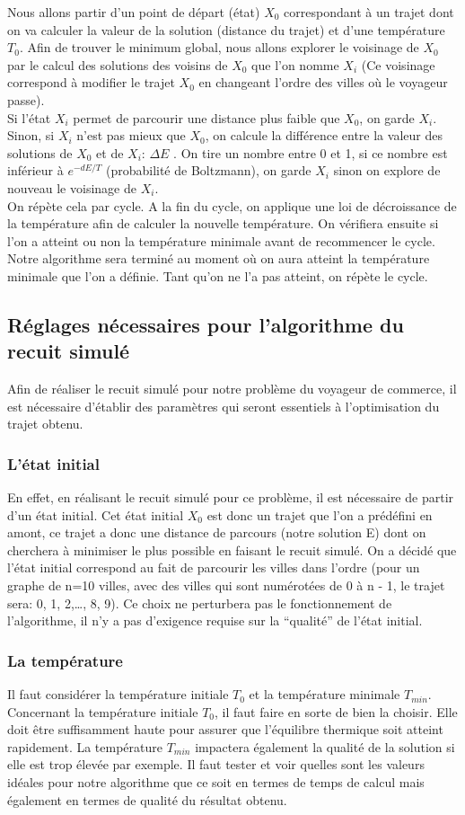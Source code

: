 \documentclass{article}
\begin{document}
Nous allons partir d’un point de départ (état) \(X_0\) correspondant à un trajet dont on va calculer la valeur de la solution (distance du trajet) et d’une température \(T_0\). Afin de trouver le minimum global, nous allons explorer le voisinage de \(X_0\) par le calcul des solutions des voisins de \(X_0\) que l’on nomme \(X_i\) (Ce voisinage correspond à modifier le trajet \(X_0\) en changeant l’ordre des villes où le voyageur passe).\\
Si l’état \(X_i\) permet de parcourir une distance plus faible que \(X_0\), on garde \(X_i\). Sinon, si \(X_i\) n’est pas mieux que \(X_0\), on calcule la différence entre la valeur des solutions de \(X_0\) et de \(X_i\): \(\Delta{E}\) . On tire un nombre entre 0 et 1, si ce nombre est inférieur à \(e^{-dE/T}\)  (probabilité de Boltzmann), on garde \(X_i\) sinon on explore de nouveau le voisinage de \(X_i\).\\
On répète cela par cycle. A la fin du cycle, on applique une loi de décroissance de la température afin de calculer la nouvelle température. On vérifiera ensuite si l’on a atteint ou non la température minimale avant de recommencer le cycle. Notre algorithme sera terminé au moment où on aura atteint la température minimale que l’on a définie. Tant qu’on ne l’a pas atteint, on répète le cycle. 
\subsection{Réglages nécessaires pour l'algorithme du recuit simulé}
Afin de réaliser le recuit simulé pour notre problème du voyageur de commerce, il est nécessaire d’établir des paramètres qui seront essentiels à l’optimisation du trajet obtenu. 
\subsubsection{L'état initial}
En effet, en réalisant le recuit simulé pour ce problème, il est nécessaire de partir d’un état initial. Cet état initial \(X_0\) est donc un trajet que l’on a prédéfini en amont, ce trajet a donc une distance de parcours (notre solution E) dont on cherchera à minimiser le plus possible en faisant le recuit simulé. On a décidé que l’état initial correspond au fait de parcourir les villes dans l’ordre (pour un graphe de n=10 villes, avec des villes qui sont numérotées de 0 à n - 1, le trajet sera: 0, 1, 2,…, 8, 9). Ce choix ne perturbera pas le fonctionnement de l’algorithme, il n’y a pas d’exigence requise sur la “qualité” de l’état initial. 
\subsubsection{La température}
Il faut considérer la température initiale \(T_0\) et la température minimale \(T_{min}\). Concernant la température initiale \(T_0\), il faut faire en sorte de bien la choisir. Elle doit être suffisamment haute pour assurer que l’équilibre thermique soit atteint rapidement. La température \(T_{min}\) impactera également la qualité de la solution si elle est trop élevée par exemple. Il faut tester et voir quelles sont les valeurs idéales pour notre algorithme que ce soit en termes de temps de calcul mais également en termes de qualité du résultat obtenu.
\end{document}
